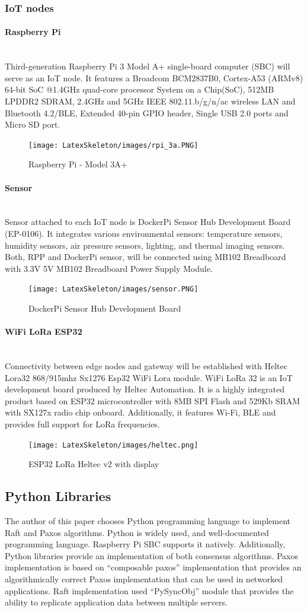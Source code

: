 \documentclass[oneside,12pt]{book}
\newcommand{\myparagraph}[1]{\paragraph{#1}\mbox{}\\}
\begin{document}
\subsubsection{IoT nodes}
\myparagraph{Raspberry Pi}
Third-generation Raspberry Pi 3 Model A+ single-board computer (SBC) will serve as an IoT node. It features a Broadcom BCM2837B0, Cortex-A53 (ARMv8) 64-bit SoC @1.4GHz quad-core processor System on a Chip(SoC), 512MB LPDDR2 SDRAM, 2.4GHz and 5GHz IEEE 802.11.b/g/n/ac wireless LAN and Bluetooth 4.2/BLE, Extended 40-pin GPIO header, Single USB 2.0 ports and Micro SD port.
\begin{figure}[H]
\centering
\texttt{[image: LatexSkeleton/images/rpi\_3a.PNG]}
\caption{Raspberry Pi - Model 3A+}
\end{figure}
\myparagraph{Sensor}
Sensor attached to each IoT node is DockerPi Sensor Hub Development Board (EP-0106). It integrates various environmental sensors: temperature sensors, humidity sensors, air pressure sensors, lighting, and thermal imaging sensors. Both, RPP and DockerPi sensor, will be connected using MB102 Breadboard with 3.3V 5V MB102 Breadboard Power Supply Module. 
\begin{figure}[H]
\centering
\texttt{[image: LatexSkeleton/images/sensor.PNG]}
\caption{DockerPi Sensor Hub Development Board}
\end{figure}
\myparagraph{WiFi LoRa ESP32}
Connectivity between edge nodes and gateway will be established with Heltec Lora32 868/915mhz Sx1276 Esp32 WiFi Lora module. WiFi LoRa 32 is an IoT development board produced by Heltec Automation. It is a highly integrated product based on ESP32 microcontroller with 8MB SPI Flash and 529Kb SRAM with SX127x radio chip onboard.  Additionally, it features Wi-Fi, BLE and provides full support for LoRa frequencies.
\begin{figure}[H]
\centering
\texttt{[image: LatexSkeleton/images/heltec.png]}
\caption{ESP32 LoRa Heltec v2 with display}
\end{figure}
\subsection{Python Libraries}
The author of this paper chooses Python programming language to implement Raft and Paxos algorithms.
Python is widely used, and well-documented programming language. Raspberry Pi SBC supports it natively. Additionally, Python libraries provide an implementation of both consensus algorithms. Paxos implementation is based on \cite{composablepaxos} “composable paxos” implementation that provides an algorithmically correct Paxos implementation that can be used in networked applications. Raft implementation used \cite{PySyncObj} “PySyncObj” module that provides the ability to replicate application data between multiple servers.
\end{document}
